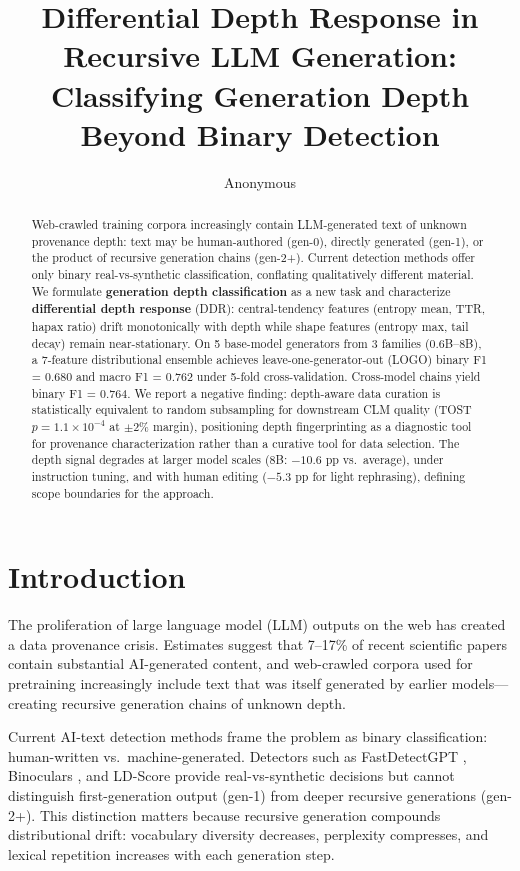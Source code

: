 \documentclass[11pt]{article}
\title{Differential Depth Response in Recursive LLM Generation:\\Classifying Generation Depth Beyond Binary Detection}
\author{Anonymous}
\begin{document}
\maketitle

\begin{abstract}
Web-crawled training corpora increasingly contain LLM-generated text of unknown provenance depth: text may be human-authored (gen-0), directly generated (gen-1), or the product of recursive generation chains (gen-2+). Current detection methods offer only binary real-vs-synthetic classification, conflating qualitatively different material. We formulate \textbf{generation depth classification} as a new task and characterize \textbf{differential depth response} (DDR): central-tendency features (entropy mean, TTR, hapax ratio) drift monotonically with depth while shape features (entropy max, tail decay) remain near-stationary. On 5 base-model generators from 3 families (0.6B--8B), a 7-feature distributional ensemble achieves leave-one-generator-out (LOGO) binary F1 = 0.680 and macro F1 = 0.762 under 5-fold cross-validation. Cross-model chains yield binary F1 = 0.764. We report a negative finding: depth-aware data curation is statistically equivalent to random subsampling for downstream CLM quality (TOST $p = 1.1 \times 10^{-4}$ at $\pm 2\%$ margin), positioning depth fingerprinting as a diagnostic tool for provenance characterization rather than a curative tool for data selection. The depth signal degrades at larger model scales (8B: $-10.6$ pp vs.\ average), under instruction tuning, and with human editing ($-5.3$ pp for light rephrasing), defining scope boundaries for the approach.
\end{abstract}

\section{Introduction}
\label{sec:intro}

The proliferation of large language model (LLM) outputs on the web has created a data provenance crisis. Estimates suggest that 7--17\% of recent scientific papers contain substantial AI-generated content, and web-crawled corpora used for pretraining increasingly include text that was itself generated by earlier models---creating recursive generation chains of unknown depth.

Current AI-text detection methods frame the problem as binary classification: human-written vs.\ machine-generated. Detectors such as FastDetectGPT \cite{bao2024fastdetectgpt}, Binoculars \cite{hans2024binoculars}, and LD-Score provide real-vs-synthetic decisions but cannot distinguish first-generation output (gen-1) from deeper recursive generations (gen-2+). This distinction matters because recursive generation compounds distributional drift: vocabulary diversity decreases, perplexity compresses, and lexical repetition increases with each generation step.
\end{document}
